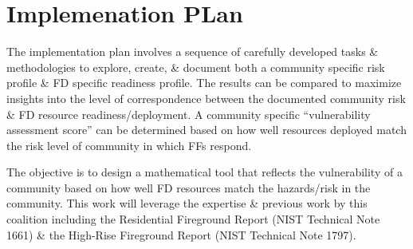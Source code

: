 \documentclass[12pt,letterpaper]{article}
\begin{document}
\section{Implemenation PLan}
\label{sec:imp_plan}

The implementation plan involves a sequence of carefully developed tasks \& methodologies to explore, create, \& document both a community specific risk profile \& FD specific readiness profile. The results can be compared to maximize insights into the level of correspondence between the documented community risk \& FD resource readiness/deployment. A community specific “vulnerability assessment score” can be determined based on how well resources deployed match the risk level of community in which FFs respond.  

The objective is to design a mathematical tool that reflects the vulnerability of a community based on how well FD resources match the hazards/risk in the community.  This work will leverage the expertise \& previous work by this coalition including the Residential Fireground Report (NIST Technical Note 1661) \& the High-Rise Fireground Report (NIST Technical Note 1797).  
\end{document}
